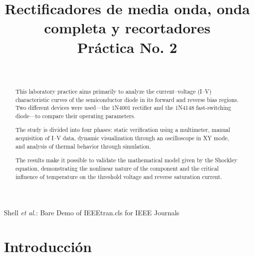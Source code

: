 \documentclass[journal]{IEEEtran}
\begin{document}
\title{Rectificadores de media onda, onda completa y recortadores\\ \small{Práctica No. 2}}

\author{
    \\
}
        
{Shell \MakeLowercase{\textit{et al.}}: Bare Demo of IEEEtran.cls for IEEE Journals}

\maketitle

\begin{abstract}
    This laboratory practice aims primarily to analyze the current–voltage (I–V) characteristic curves of the semiconductor diode in its forward and reverse bias regions. Two different devices were used—the 1N4001 rectifier and the 1N4148 fast-switching diode—to compare their operating parameters.

The study is divided into four phases: static verification using a multimeter, manual acquisition of I–V data, dynamic visualization through an oscilloscope in XY mode, and analysis of thermal behavior through simulation.

The results make it possible to validate the mathematical model given by the Shockley equation, demonstrating the nonlinear nature of the component and the critical influence of temperature on the threshold voltage and reverse saturation current.

\end{abstract}

\section{Introducción}
\end{document}
